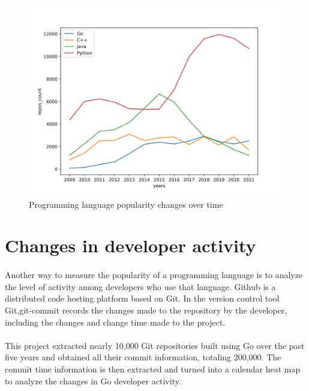 \documentclass[11pt,onside,a4paper,fleqn]{report}
\begin{document}
\begin{figure}[ht]
\centering
\includegraphics[scale=0.6]{result/yearsChange_modifed.png}
\caption{Programming language popularity changes over time}
\label{fig:pathdemo4}
\end{figure}

\section{Changes in developer activity}
\paragraph{} Another way to measure the popularity of a programming language is to analyze the level of activity among
developers who use that language. Github is a distributed code hosting platform based on Git. In the version 
control tool Git,git-commit records the changes made to the repository by the developer, including the changes and change time made to the project.

\paragraph{} This project extracted nearly 10,000 Git repositories built using Go over the past five years and obtained all
their commit information, totaling 200,000. The commit time information is then extracted and turned into
a calendar heat map to analyze the changes in Go developer activity.
\end{document}
